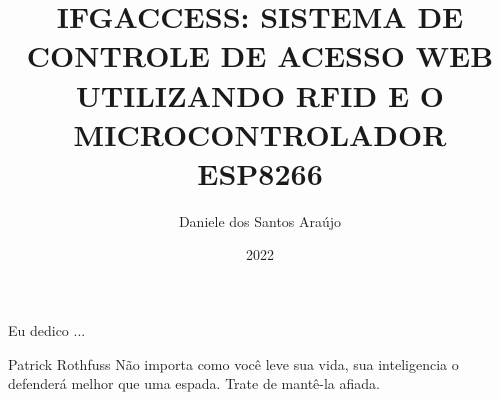 \documentclass[pt,oneside,onehalfspacing,bsc]{ifgtcc}
\title{IFGACCESS: SISTEMA DE CONTROLE DE ACESSO WEB UTILIZANDO RFID E O MICROCONTROLADOR ESP8266}
\date{2022}
\author{Daniele dos Santos Araújo}
\begin{document}
\frontmatter
\frontpage
\presentationpage

\begin{fichacatalografica}
\FakeFichaCatalografica %
\end{fichacatalografica}

\begin{ata}
\begin{figure}
	\centering 
	
\end{figure}
\end{ata}

\begin{ata}
	\begin{figure}
		\centering 
		
	\end{figure}
\end{ata}

\begin{dedicatory}
Eu dedico ...
\end{dedicatory}

% 

\begin{epigraph}[]{Patrick Rothfuss}
    Não importa como você leve sua vida, sua inteligencia o \\ defenderá melhor que uma espada. Trate de mantê-la afiada.
\end{epigraph}

\resumo
{\parindent0pt
	
}

\abstract
{\parindent0pt
	
}

\listoffigures
\listoftables
\listofacronyms %

\tableofcontents

\mainmatter
    
    
    
    
    

\begin{references}
  
\end{references}

\theappendix
\end{document}

